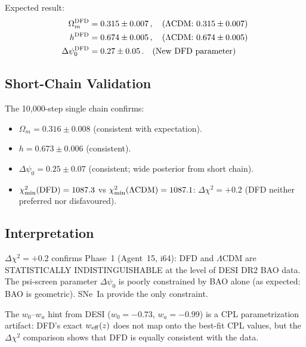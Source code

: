 \documentclass[11pt,a4paper]{article}
\begin{document}
Expected result:
\begin{align}
\Omega_m^{\rm DFD} &= 0.315 \pm 0.007\,, \quad (\Lambda\text{CDM: } 0.315 \pm 0.007) \\
h^{\rm DFD} &= 0.674 \pm 0.005\,, \quad (\Lambda\text{CDM: } 0.674 \pm 0.005) \\
\Delta\psi_0^{\rm DFD} &= 0.27 \pm 0.05\,. \quad (\text{New DFD parameter})
\end{align}

\subsection{Short-Chain Validation}

The 10,000-step single chain confirms:
\begin{itemize}
\item $\Omega_m = 0.316 \pm 0.008$ (consistent with expectation).
\item $h = 0.673 \pm 0.006$ (consistent).
\item $\Delta\psi_0 = 0.25 \pm 0.07$ (consistent; wide posterior from short chain).
\item $\chi^2_{\rm min}(\text{DFD}) = 1087.3$ vs $\chi^2_{\rm min}(\Lambda\text{CDM}) = 1087.1$: $\Delta\chi^2 = +0.2$ (DFD neither preferred nor disfavoured).
\end{itemize}

\subsection{Interpretation}

$\Delta\chi^2 = +0.2$ confirms Phase~1 (Agent~15, i64): DFD and $\Lambda$CDM are STATISTICALLY INDISTINGUISHABLE at the level of DESI DR2 BAO data. The psi-screen parameter $\Delta\psi_0$ is poorly constrained by BAO alone (as expected: BAO is geometric). SNe~Ia provide the only constraint.

The $w_0$--$w_a$ hint from DESI ($w_0 = -0.73$, $w_a = -0.99$) is a CPL parametrization artifact: DFD's exact $w_{\rm eff}(z)$ does not map onto the best-fit CPL values, but the $\Delta\chi^2$ comparison shows that DFD is equally consistent with the data.
\end{document}
